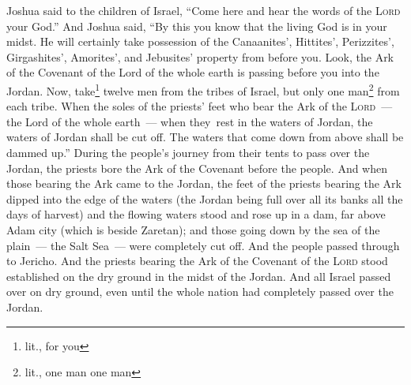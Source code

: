 \begin{inparaenum}
     Joshua said to the children of Israel, ``Come here and hear the words of the \textsc{Lord} your God.''%
     And Joshua said, ``By this you know that the living God is in your midst. He will certainly take possession of the Canaanites', Hittites', Perizzites', Girgashites', Amorites', and Jebusites' property from before you.%
     Look, the Ark of the Covenant of the Lord of the whole earth is passing before you into the Jordan.%
     Now, take\footnote{lit., for you} twelve men from the tribes of Israel, but only one man\footnote{lit., one man one man} from each tribe.%
     When the soles of the priests' feet who bear the Ark of the \textsc{Lord}~--- the Lord of the whole earth~--- when they\understood\ rest in the waters of Jordan, the waters of Jordan shall be cut off. The waters that come down from above shall be dammed up.''%
     During the people's journey from their tents to pass over the Jordan, the priests bore the Ark of the Covenant before the people.%
     And when those bearing the Ark came to the Jordan, the feet of the priests bearing the Ark dipped into the edge of the waters (the Jordan being full over all its banks all the days of harvest)%
     and the flowing waters stood and rose up in a dam, far above Adam city (which is beside Zaretan); and those going down by the sea of the plain~--- the Salt Sea~--- were completely cut off. And the people passed through to Jericho.%
     And the priests bearing the Ark of the Covenant of the \textsc{Lord} stood established on the dry ground in the midst of the Jordan. And all Israel passed over on dry ground, even until the whole nation had completely passed over the Jordan.%
\end{inparaenum}
